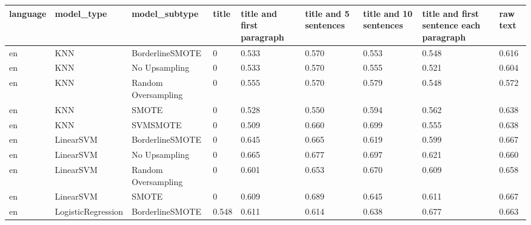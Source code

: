 \begin{tabular}{lllllllll}
\toprule
language &                   model\_type &       model\_subtype &     title & title and first paragraph & title and 5 sentences & title and 10 sentences & title and first sentence each paragraph &  raw text \\
\midrule
      en &                          KNN &     BorderlineSMOTE &         0 &                     0.533 &                 0.570 &                  0.553 &                                   0.548 &     0.616 \\
      en &                          KNN &       No Upsampling &         0 &                     0.533 &                 0.570 &                  0.555 &                                   0.521 &     0.604 \\
      en &                          KNN & Random Oversampling &         0 &                     0.555 &                 0.570 &                  0.579 &                                   0.548 &     0.572 \\
      en &                          KNN &               SMOTE &         0 &                     0.528 &                 0.550 &                  0.594 &                                   0.562 &     0.638 \\
      en &                          KNN &            SVMSMOTE &         0 &                     0.509 &                 0.660 &                  0.699 &                                   0.555 &     0.638 \\
      en &                    LinearSVM &     BorderlineSMOTE &         0 &                     0.645 &                 0.665 &                  0.619 &                                   0.599 &     0.667 \\
      en &                    LinearSVM &       No Upsampling &         0 &                     0.665 &                 0.677 &                  0.697 &                                   0.621 &     0.660 \\
      en &                    LinearSVM & Random Oversampling &         0 &                     0.601 &                 0.653 &                  0.670 &                                   0.609 &     0.658 \\
      en &                    LinearSVM &               SMOTE &         0 &                     0.609 &                 0.689 &                  0.645 &                                   0.611 &     0.667 \\
      en &           LogisticRegression &     BorderlineSMOTE &     0.548 &                     0.611 &                 0.614 &                  0.638 &                                   0.677 &     0.663 \\

\end{tabular}

